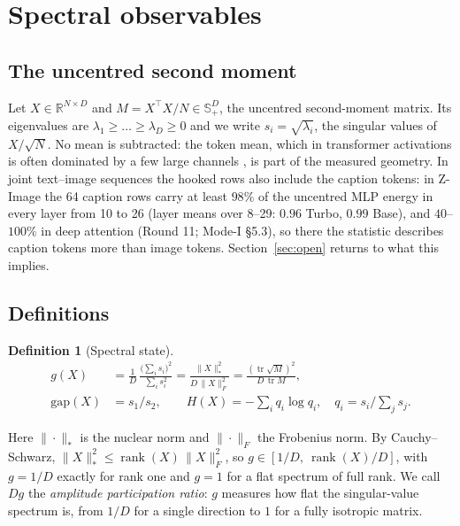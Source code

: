 \documentclass[11pt]{article}
\theoremstyle{definition}
\newtheorem{definition}[theorem]{Definition}
\newcommand{\tr}{\operatorname{tr}}
\newcommand{\R}{\mathbb{R}}
\newcommand{\PSD}{\mathbb{S}_{+}}
\newcommand{\gap}{\mathrm{gap}}
\begin{document}
\section{Spectral observables}\label{sec:observables}

\subsection{The uncentred second moment}
Let $X\in\R^{N\times D}$ and $M=X^\top X/N\in\PSD^D$, the uncentred second-moment matrix. Its eigenvalues are $\lambda_1\ge\dots\ge\lambda_D\ge 0$ and we write $s_i=\sqrt{\lambda_i}$, the singular values of $X/\sqrt N$. No mean is subtracted: the token mean, which in transformer activations is often dominated by a few large channels \citep{sun2024massive}, is part of the measured geometry. In joint text--image sequences the hooked rows also include the caption tokens: in Z-Image the 64 caption rows carry at least $98\%$ of the uncentred MLP energy in every layer from 10 to 26 (layer means over 8--29: $0.96$ Turbo, $0.99$ Base), and $40$--$100\%$ in deep attention (Round 11; Mode-I \S5.3), so there the statistic describes caption tokens more than image tokens. Section~\ref{sec:open} returns to what this implies.

\subsection{Definitions}
\begin{definition}[Spectral state]
\begin{align}
 g(X) &= \frac{1}{D}\,\frac{\big(\sum_i s_i\big)^2}{\sum_i s_i^2}
 = \frac{\|X\|_*^2}{D\,\|X\|_F^2} = \frac{(\tr\sqrt{M})^2}{D\,\tr M},\label{eq:g}\\
 \gap(X) &= s_1/s_2,\qquad
 H(X) = -\sum_i q_i\log q_i,\quad q_i = s_i\Big/\sum_j s_j .
\end{align}
\end{definition}
Here $\|\cdot\|_*$ is the nuclear norm and $\|\cdot\|_F$ the Frobenius norm. By Cauchy--Schwarz, $\|X\|_*^2\le \operatorname{rank}(X)\,\|X\|_F^2$, so $g\in[1/D,\ \operatorname{rank}(X)/D]$, with $g=1/D$ exactly for rank one and $g=1$ for a flat spectrum of full rank. We call $D g$ the \emph{amplitude participation ratio}: $g$ measures how flat the singular-value spectrum is, from $1/D$ for a single direction to $1$ for a fully isotropic matrix.
\end{document}
